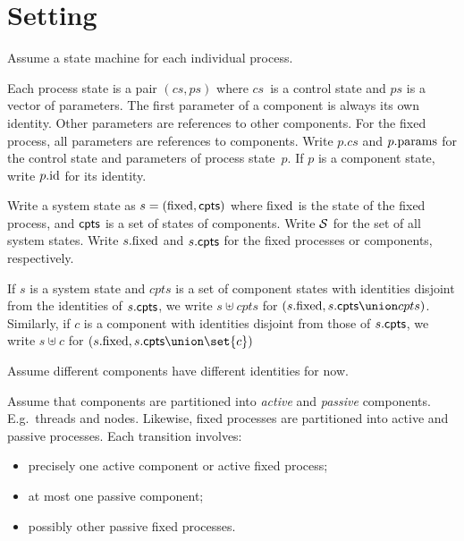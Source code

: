 
\section{Setting}

Assume a state machine for each individual process. 

Each process state is a pair $(cs, ps)$ where $cs$~is a control state and $ps$
is a vector of parameters.  The first parameter of a component is always its
own identity.  Other parameters are references to other components.  For the
fixed process, all parameters are references to components.  Write $p.cs$ and
$p.\params$ for the control state and parameters of process state~$p$.  If $p$
is a component state, write $p.\id$ for its identity.
  

Write a system state as $s = (\fixed, \cpt)$ where $\fixed$ is the state of
the fixed process, and $\cpt$ is a set of states of components.  Write $\S$
for the set of all system states.  Write $s.\fixed$ and $s.\cpt$ for the fixed
processes or components, respectively.

If $s$ is a system state and $cpts$ is a set of component states with
identities disjoint from the identities of $s.\cpt$, we write $s \uplus cpts$
for $(s.\fixed, s.\cpt \union cpts)$.  Similarly, if $c$ is a component with
identities disjoint from those of $s.\cpts$, we write $s \uplus c$ for
$(s.\fixed, s.\cpt \union \set{c})$


Assume different components have different identities for now. 


Assume that components are partitioned into \emph{active} and \emph{passive}
components.  E.g.~threads and nodes.  Likewise, fixed processes are
partitioned into active and passive processes.  Each transition involves:
\begin{itemize}
\item precisely one active component or active fixed process;
\item at most one passive component;
\item possibly other passive fixed processes.
\end{itemize}

